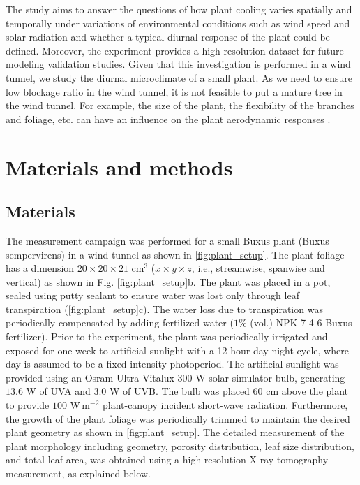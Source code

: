The study aims to answer the questions of how plant cooling varies spatially and temporally under variations of environmental conditions such as wind speed and solar radiation and whether a typical diurnal response of the plant could be defined. Moreover, the experiment provides a high-resolution dataset for future modeling validation studies. Given that this investigation is performed in a wind tunnel, we study the diurnal microclimate of a small plant. As we need to ensure low blockage ratio in the wind tunnel, it is not feasible to put a mature tree in the wind tunnel. For example, the size of the plant, the flexibility of the branches and foliage, etc. can have an influence on the plant aerodynamic responses \citep{DeLangre2008,Manickathan2018b}. 

\section{Materials and methods}

\subsection{Materials}


The measurement campaign was performed for a small Buxus plant (Buxus sempervirens) in a wind tunnel as shown in \cref{fig:plant_setup}. The plant foliage has a dimension $20\times20\times21$ cm$^3$ ($x\times y\times z$, i.e., streamwise, spanwise and vertical) as shown in Fig. \cref{fig:plant_setup}b. The plant was placed in a pot, sealed using putty sealant to ensure water was lost only through leaf transpiration (\cref{fig:plant_setup}c). The water loss due to transpiration was periodically compensated by adding fertilized water ($1$\% (vol.) NPK 7-4-6 Buxus fertilizer). Prior to the experiment, the plant was periodically irrigated and exposed for one week to artificial sunlight with a 12-hour day-night cycle, where day is assumed to be a fixed-intensity photoperiod. The artificial sunlight was provided using an Osram Ultra-Vitalux $300$ W solar simulator bulb, generating $13.6$ W of UVA and $3.0$ W of UVB. The bulb was placed 60 cm above the plant to provide $100$ W\,m$^{-2}$ plant-canopy incident short-wave radiation. Furthermore, the growth of the plant foliage was periodically trimmed to maintain the desired plant geometry as shown in \cref{fig:plant_setup}. The detailed measurement of the plant morphology including geometry, porosity distribution, leaf size distribution, and total leaf area, was obtained using a high-resolution X-ray tomography measurement, as explained below. 

